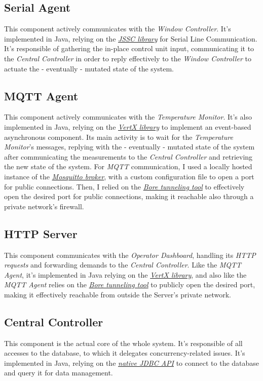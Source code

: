 \documentclass[a4paper,12pt]{report}
\begin{document}
		\subsection{Serial Agent}
		This component actively communicates with the \textit{Window Controller}. It's implemented in Java, relying on the \href{https://github.com/java-native/jssc}{\textit{JSSC library}} for Serial Line Communication. It's responsible of gathering the in-place control unit input, communicating it to the \textit{Central Controller} in order to reply effectively to the \textit{Window Controller} to actuate the - eventually - mutated state of the system.
		\subsection{MQTT Agent}
		This component actively communicates with the \textit{Temperature Monitor}. It's also implemented in Java, relying on the \href{https://vertx.io/}{\textit{VertX library}} to implement an event-based asynchronous component. Its main activity is to wait for the \textit{Temperature Monitor}'s messages, replying with the - eventually - mutated state of the system after communicating the measurements to the \textit{Central Controller} and retrieving the new state of the system.
		For \textit{MQTT} communication, I used a locally hosted instance of the \href{https://mosquitto.org/}{\textit{Mosquitto broker}}, with a custom configuration file to open a port for public connections. Then, I relied on the \href{https://github.com/ekzhang/bore}{\textit{Bore tunneling tool}} to effectively open the desired port for public connections, making it reachable also through a private network's firewall.
		\subsection{HTTP Server}
		This component communicates with the \textit{Operator Dashboard}, handling its \textit{HTTP requests} and forwarding demands to the \textit{Central Controller}. Like the \textit{MQTT Agent}, it's implemented in Java relying on the \href{https://vertx.io/}{\textit{VertX library}}, and also like the \textit{MQTT Agent} relies on the \href{https://github.com/ekzhang/bore}{\textit{Bore tunneling tool}} to publicly open the desired port, making it effectively reachable from outside the Server's private network.
		\subsection{Central Controller}
		This component is the actual core of the whole system. It's responsible of all accesses to the database, to which it delegates concurrency-related issues. It's implemented in Java, relying on the \href{https://docs.oracle.com/javase/8/docs/technotes/guides/jdbc/}{\textit{native JDBC API}} to connect to the database and query it for data management.
	
\end{document}
